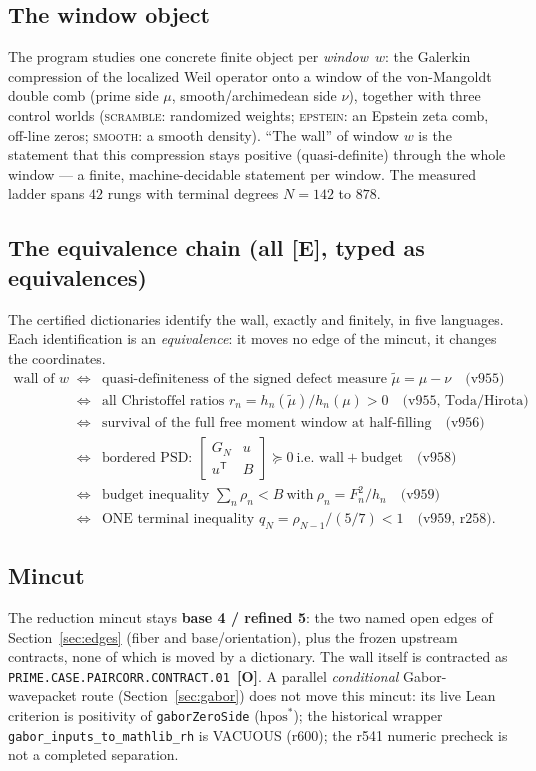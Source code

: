 \documentclass[11pt]{article}
\newcommand{\mE}{\textcolor{certgreen}{\textbf{[E]}}}
\newcommand{\mO}{\textcolor{openred}{\textbf{[O]}}}
\theoremstyle{definition}
\theoremstyle{remark}
\newcommand{\mut}{\tilde\mu}
\begin{document}
\subsection{The window object}
The program studies one concrete finite object per \emph{window}~$w$: the
Galerkin compression of the localized Weil operator onto a window of the
von-Mangoldt double comb (prime side $\mu$, smooth/archimedean side $\nu$),
together with three control worlds (\textsc{scramble}: randomized weights;
\textsc{epstein}: an Epstein zeta comb, off-line zeros; \textsc{smooth}: a
smooth density).  ``The wall'' of window $w$ is the statement that this
compression stays positive (quasi-definite) through the whole window ---
a finite, machine-decidable statement per window.  The measured ladder
spans $42$ rungs with terminal degrees $N=142$ to $878$.

\subsection{The equivalence chain (all \mE, typed as equivalences)}
The certified dictionaries identify the wall, exactly and finitely, in
five languages.  Each identification is an \emph{equivalence}: it moves no
edge of the mincut, it changes the coordinates.
\[
\begin{array}{rcl}
\text{wall of } w
&\Longleftrightarrow&
\text{quasi-definiteness of the signed defect measure } \mut=\mu-\nu
\quad\text{(v955)}\\[2pt]
&\Longleftrightarrow&
\text{all Christoffel ratios } r_n=h_n(\mut)/h_n(\mu)>0
\quad\text{(v955, Toda/Hirota)}\\[2pt]
&\Longleftrightarrow&
\text{survival of the full free moment window at half-filling}
\quad\text{(v956)}\\[2pt]
&\Longleftrightarrow&
\text{bordered PSD: } \begin{bmatrix} G_N & u\\ u^{\mathsf T} & B\end{bmatrix}\succeq 0
\ \text{i.e. wall} + \text{budget}
\quad\text{(v958)}\\[2pt]
&\Longleftrightarrow&
\text{budget inequality } \textstyle\sum_n \rho_n < B \ \text{with}\
\rho_n = F_n^2/h_n
\quad\text{(v959)}\\[2pt]
&\Longleftrightarrow&
\text{ONE terminal inequality } q_N = \rho_{N-1}/(5/7) < 1
\quad\text{(v959, r258)}.
\end{array}
\]

\subsection{Mincut}
The reduction mincut stays \textbf{base 4 / refined 5}: the two named open
edges of Section~\ref{sec:edges} (fiber and base/orientation), plus the
frozen upstream contracts, none of which is moved by a dictionary.  The
wall itself is contracted as \texttt{PRIME.CASE.PAIRCORR.CONTRACT.01}~\mO.
A parallel \emph{conditional} Gabor-wavepacket route
(Section~\ref{sec:gabor}) does not move this mincut: its live Lean
criterion is positivity of \texttt{gaborZeroSide} ($\mathrm{hpos}^*$);
the historical wrapper \texttt{gabor\_inputs\_to\_mathlib\_rh} is
VACUOUS (r600); the r541 numeric precheck is not a completed
separation.
\end{document}
